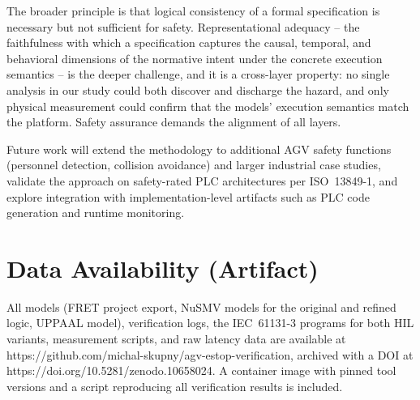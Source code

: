\documentclass{ieeeaccess}
\theoremstyle{definition}
\begin{document}
The broader principle is that logical consistency of a formal specification is necessary but not sufficient for safety. Representational adequacy -- the faithfulness with which a specification captures the causal, temporal, and behavioral dimensions of the normative intent under the concrete execution semantics -- is the deeper challenge, and it is a cross-layer property: no single analysis in our study could both discover and discharge the hazard, and only physical measurement could confirm that the models' execution semantics match the platform. Safety assurance demands the alignment of all layers.

Future work will extend the methodology to additional AGV safety functions (personnel detection, collision avoidance) and larger industrial case studies, validate the approach on safety-rated PLC architectures per ISO~13849-1, and explore integration with implementation-level artifacts such as PLC code generation and runtime monitoring.

\section*{Data Availability (Artifact)}
\label{sec:artifact}
All models (FRET project export, NuSMV models for the original and refined logic, UPPAAL model), verification logs, the IEC~61131-3 programs for both HIL variants, measurement scripts, and raw latency data are available at https://github.com/michal-skupny/agv-estop-verification, archived with a DOI at https://doi.org/10.5281/zenodo.10658024. A container image with pinned tool versions and a script reproducing all verification results is included.
\end{document}
